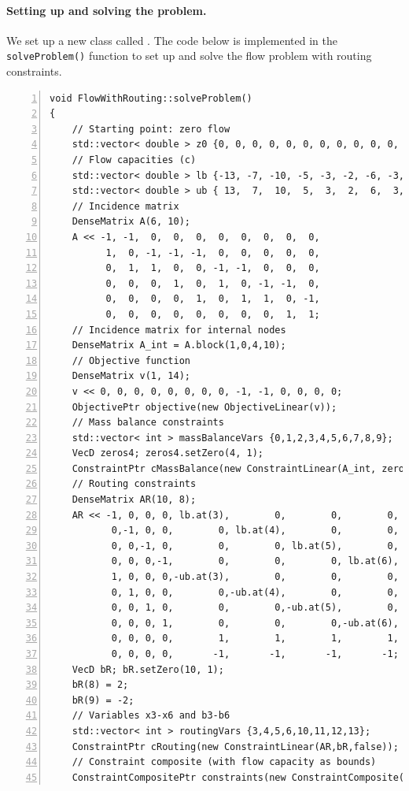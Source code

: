 \paragraph{Setting up and solving the problem.} We set up a new  class called . The code below is implemented in the \texttt{solveProblem()} function to set up and solve the flow problem with routing constraints.
\begin{lstlisting}[numbers=left]
void FlowWithRouting::solveProblem()
{
    // Starting point: zero flow
    std::vector< double > z0 {0, 0, 0, 0, 0, 0, 0, 0, 0, 0, 0, 0, 0, 0};
    // Flow capacities (c)
    std::vector< double > lb {-13, -7, -10, -5, -3, -2, -6, -3, -9, -12, 0, 0, 0, 0};
    std::vector< double > ub { 13,  7,  10,  5,  3,  2,  6,  3,  9,  12, 1, 1, 1, 1};
    // Incidence matrix
    DenseMatrix A(6, 10);
    A << -1, -1,  0,  0,  0,  0,  0,  0,  0,  0,
          1,  0, -1, -1, -1,  0,  0,  0,  0,  0,
          0,  1,  1,  0,  0, -1, -1,  0,  0,  0,
          0,  0,  0,  1,  0,  1,  0, -1, -1,  0,
          0,  0,  0,  0,  1,  0,  1,  1,  0, -1,
          0,  0,  0,  0,  0,  0,  0,  0,  1,  1;
    // Incidence matrix for internal nodes
    DenseMatrix A_int = A.block(1,0,4,10);
    // Objective function
    DenseMatrix v(1, 14);
    v << 0, 0, 0, 0, 0, 0, 0, 0, -1, -1, 0, 0, 0, 0;
    ObjectivePtr objective(new ObjectiveLinear(v));
    // Mass balance constraints
    std::vector< int > massBalanceVars {0,1,2,3,4,5,6,7,8,9};
    VecD zeros4; zeros4.setZero(4, 1);
    ConstraintPtr cMassBalance(new ConstraintLinear(A_int, zeros4, true));
    // Routing constraints
    DenseMatrix AR(10, 8);
    AR << -1, 0, 0, 0, lb.at(3),        0,        0,        0,
           0,-1, 0, 0,        0, lb.at(4),        0,        0,
           0, 0,-1, 0,        0,        0, lb.at(5),        0,
           0, 0, 0,-1,        0,        0,        0, lb.at(6),
           1, 0, 0, 0,-ub.at(3),        0,        0,        0,
           0, 1, 0, 0,        0,-ub.at(4),        0,        0,
           0, 0, 1, 0,        0,        0,-ub.at(5),        0,
           0, 0, 0, 1,        0,        0,        0,-ub.at(6),
           0, 0, 0, 0,        1,        1,        1,        1,
           0, 0, 0, 0,       -1,       -1,       -1,       -1;
    VecD bR; bR.setZero(10, 1);
    bR(8) = 2;
    bR(9) = -2;
    // Variables x3-x6 and b3-b6
    std::vector< int > routingVars {3,4,5,6,10,11,12,13};
    ConstraintPtr cRouting(new ConstraintLinear(AR,bR,false));
    // Constraint composite (with flow capacity as bounds)
    ConstraintCompositePtr constraints(new ConstraintComposite(14, lb, ub));

\end{lstlisting}
